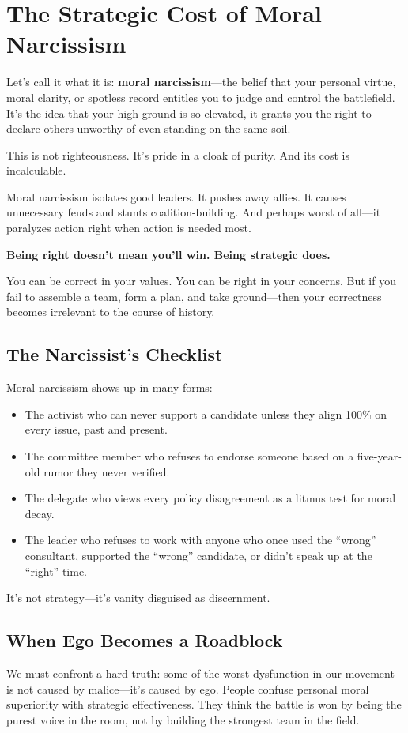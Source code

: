 \section{The Strategic Cost of Moral Narcissism}

Let’s call it what it is: \textbf{moral narcissism}—the belief that your personal virtue, moral clarity, or spotless record entitles you to judge and control the battlefield. It’s the idea that your high ground is so elevated, it grants you the right to declare others unworthy of even standing on the same soil.

This is not righteousness. It’s pride in a cloak of purity. And its cost is incalculable.

Moral narcissism isolates good leaders. It pushes away allies. It causes unnecessary feuds and stunts coalition-building. And perhaps worst of all—it paralyzes action right when action is needed most.

\textbf{Being right doesn’t mean you’ll win. Being strategic does.}

You can be correct in your values. You can be right in your concerns. But if you fail to assemble a team, form a plan, and take ground—then your correctness becomes irrelevant to the course of history.

\subsection*{The Narcissist’s Checklist}
Moral narcissism shows up in many forms:
\begin{itemize}
    \item The activist who can never support a candidate unless they align 100\% on every issue, past and present.
    \item The committee member who refuses to endorse someone based on a five-year-old rumor they never verified.
    \item The delegate who views every policy disagreement as a litmus test for moral decay.
    \item The leader who refuses to work with anyone who once used the ``wrong'' consultant, supported the ``wrong'' candidate, or didn’t speak up at the ``right'' time.
\end{itemize}

It’s not strategy—it’s vanity disguised as discernment.

\subsection*{When Ego Becomes a Roadblock}
We must confront a hard truth: some of the worst dysfunction in our movement is not caused by malice—it’s caused by ego. People confuse personal moral superiority with strategic effectiveness. They think the battle is won by being the purest voice in the room, not by building the strongest team in the field.

